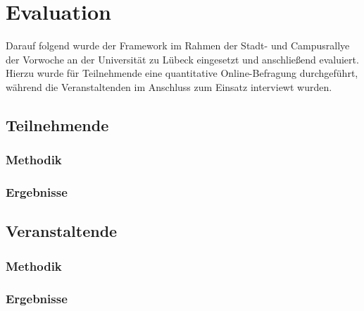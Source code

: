 \chapter{Evaluation}

Darauf folgend wurde der Framework im Rahmen der Stadt- und Campusrallye der
Vorwoche an der Universität zu Lübeck eingesetzt und anschließend evaluiert.
Hierzu wurde für Teilnehmende eine quantitative Online-Befragung durchgeführt,
während die Veranstaltenden im Anschluss zum Einsatz interviewt wurden.

\section{Teilnehmende}

\subsection{Methodik}

\subsection{Ergebnisse}

\section{Veranstaltende}

\subsection{Methodik}

\subsection{Ergebnisse}